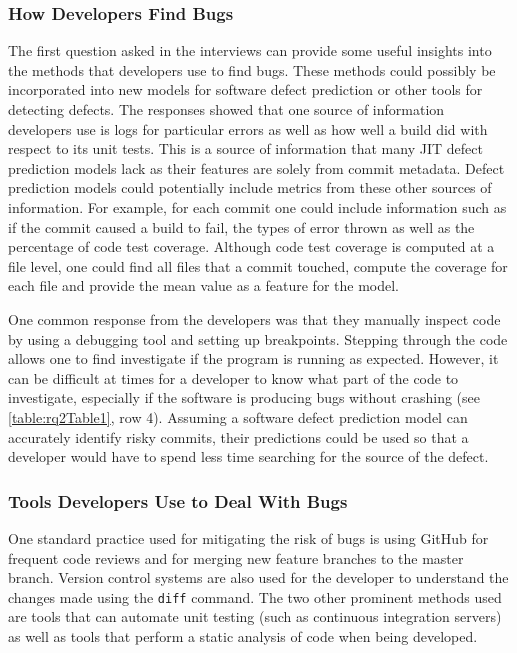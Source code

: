 \documentclass[../main.tex]{subfiles}
\begin{document}
\subsubsection{How Developers Find Bugs}

The first question asked in the interviews can provide some useful insights into the methods that developers use to find bugs. These methods could possibly be incorporated into new models for software defect prediction or other tools for detecting defects. The responses showed that one source of information developers use is logs for particular errors as well as how well a build did with respect to its unit tests. This is a source of information that many JIT defect prediction models lack as their features are solely from commit metadata. Defect prediction models could potentially include metrics from these other sources of information. For example, for each commit one could include information such as if the commit caused a build to fail, the types of error thrown as well as the percentage of code test coverage. Although code test coverage is computed at a file level, one could find all files that a commit touched, compute the coverage for each file and provide the mean value as a feature for the model. 

One common response from the developers was that they manually inspect code by using a debugging tool and setting up breakpoints. Stepping through the code allows one to find investigate if the program is running as expected. However, it can be difficult at times for a developer to know what part of the code to investigate, especially if the software is producing bugs without crashing (see \ref{table:rq2Table1}, row 4). Assuming a software defect prediction model can accurately identify risky commits, their predictions could be used so that a developer would have to spend less time searching for the source of the defect.

\subsubsection{Tools Developers Use to Deal With Bugs}

One standard practice used for mitigating the risk of bugs is using GitHub for frequent code reviews and for merging new feature branches to the master branch. Version control systems are also used for the developer to understand the changes made using the \texttt{diff} command. The two other prominent methods used are tools that can automate unit testing (such as continuous integration servers) as well as tools that perform a static analysis of code when being developed. 
\end{document}
